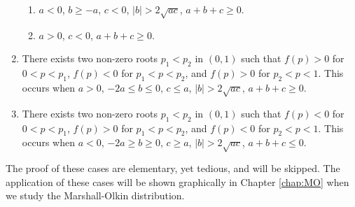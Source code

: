 \begin{prop}
\begin{enumerate}
\begin{enumerate}
            \item $a<0$, $b\geq -a$, $c<0$, $|b|>2\sqrt{ac}$, $a+b+c\geq 0$.
            \item $a>0$, $c<0$, $a+b+c\geq 0$.
        \end{enumerate}
        \item There exists two non-zero roots $p_1<p_2$ in $(0,1)$ such that $f(p)>0$ for $0<p<p_1$, $f(p)<0$ for $p_1<p<p_2$, and $f(p)>0$ for $p_2<p<1$. This occurs when $a>0$, $-2a\leq b\leq 0$, $c\leq a$, $|b|>2\sqrt{ac}$, $a+b+c\geq0$.
        \item There exists two non-zero roots $p_1<p_2$ in $(0,1)$ such that $f(p)<0$ for $0<p<p_1$, $f(p)>0$ for $p_1<p<p_2$, and $f(p)<0$ for $p_2<p<1$. This occurs when $a<0$, $-2a\geq b\geq 0$, $c\geq a$, $|b|>2\sqrt{ac}$, $a+b+c\leq 0$.
    \end{enumerate}
\end{prop}
The proof of these cases are elementary, yet tedious, and will be skipped. The application of these cases will be shown graphically in Chapter \ref{chap:MO} when we study the Marshall-Olkin distribution.